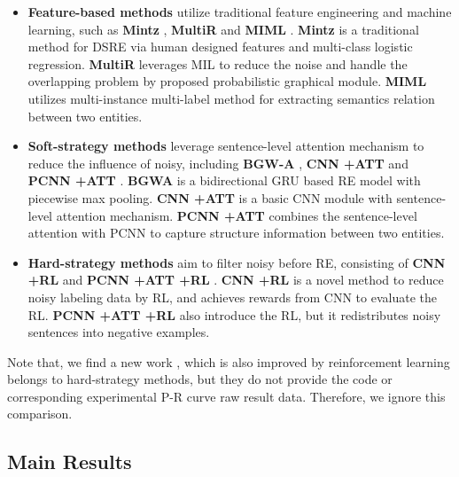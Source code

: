 \documentclass{article}
\begin{document}
\begin{itemize}
    \item \textbf{Feature-based methods} utilize traditional feature engineering and machine learning, such as \textbf{Mintz} \cite{mintz2009distant}, \textbf{MultiR} \cite{hoffmann2011knowledge} and \textbf{MIML} \cite{Surdeanu2012Multi}. \textbf{Mintz} is a traditional method for DSRE via human designed features and multi-class logistic regression. \textbf{MultiR} leverages MIL to reduce the noise and handle the overlapping problem by proposed probabilistic graphical module. \textbf{MIML} utilizes multi-instance multi-label method for extracting semantics relation between two entities.
    
    \item \textbf{Soft-strategy methods} leverage sentence-level attention mechanism to reduce the influence of noisy, including \textbf{BGW-A} \cite{Jat2018Improving}, \textbf{CNN +ATT} and \textbf{PCNN +ATT} \cite{Lin2016Neural}. \textbf{BGWA} is a bidirectional GRU based RE model with piecewise max pooling. \textbf{CNN +ATT} is a basic CNN module with sentence-level attention mechanism. \textbf{PCNN +ATT} combines the sentence-level attention with PCNN to capture structure information between two entities.
    
    \item  \textbf{Hard-strategy methods} aim to filter noisy before RE, consisting of \textbf{CNN +RL}  \cite{Feng2018Reinforcement} and \textbf{PCNN +ATT +RL} \cite{Qin2018Robust}. \textbf{CNN +RL} is a novel method to reduce noisy labeling data by RL, and achieves rewards from CNN to evaluate the RL. \textbf{PCNN +ATT +RL} also introduce the RL, but it redistributes noisy sentences into negative examples.
\end{itemize}
Note that, we find a new work \cite{he2019improving}, which is also improved by reinforcement learning belongs to hard-strategy methods, but they do not provide the code or corresponding experimental P-R curve raw result data. Therefore, we ignore this comparison.

\subsection{Main Results}
\end{document}
